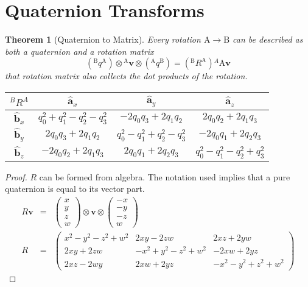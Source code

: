 \documentclass{amsart}
\newtheorem{theorem}{Theorem}[section]
\theoremstyle{definition}
\theoremstyle{remark}
\numberwithin{equation}{section}
\begin{document}
\section{Quaternion Transforms}



\begin{theorem}[Quaternion to Matrix]
  Every rotation $\mathrm{A}\to\mathrm{B}$ can be described as both a quaternion and a rotation matrix
  \begin{equation}
    \left({^\mathrm{B}q^\mathrm{A}}\right) \otimes {^\mathrm{A}\mathbf{v}} \otimes \left({^\mathrm{A}q^\mathrm{B}}\right) = \left({^\mathrm{B}R^\mathrm{A}}\right){^A\mathrm{A}\mathbf{v}}
  \end{equation}
  that rotation matrix also collects the dot products of the rotation.
  
  \begin{tabular}{c|ccc}
    ${^BR^A}$ & $\hat{\mathbf{a}}_x$ & $\hat{\mathbf{a}}_y$ & $\hat{\mathbf{a}}_z$ \\
    \hline
    $\hat{\mathbf{b}}_x$ & $q_0^2+q_1^2-q_2^2-q_3^2$ & $-2q_0q_3+2q_1q_2$ & $2q_0q_2 + 2q_1q_3$ \\
    $\hat{\mathbf{b}}_y$ & $2q_0q_3+2q_1q_2$ & $q_0^2-q_1^2+q_2^2-q_3^2$ &  $-2q_0q_1 + 2q_2q_3$ \\
    $\hat{\mathbf{b}}_z$ & $-2q_0q_2+2q_1q_3$ & $2q_0q_1+2q_2q_3$ & $q_0^2-q_1^2-q_2^2+q_3^2$
  \end{tabular}\centering
\end{theorem}
\begin{proof}
  $R$ can be formed from algebra. The notation used implies that a pure quaternion is equal to its vector part.
  \begin{eqnarray}
    R \mathbf{v} &=&
    \begin{pmatrix}
      x \\
      y \\
      z \\
      w
    \end{pmatrix} \otimes
    \mathbf{v} \otimes
    \begin{pmatrix}
      -x \\
      -y \\
      -z \\
      w
    \end{pmatrix} \nonumber \\
    R &=&
    \begin{pmatrix}
      x^2-y^2-z^2+w^2 & 2xy-2zw & 2xz+2yw \\
      2xy+2zw & -x^2+y^2-z^2+w^2 & -2xw+2yz \\
      2xz-2wy & 2xw+2yz & -x^2-y^2+z^2+w^2
    \end{pmatrix}
  \end{eqnarray} 
\end{proof}
\end{document}
